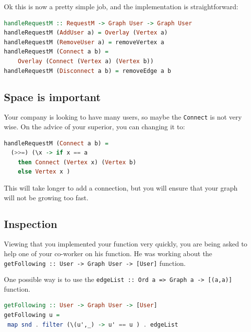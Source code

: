 \documentclass[10pt,a4paper]{article}
\begin{document}
Ok this is now a pretty simple job, and the implementation is straightforward: 
\begin{lstlisting}[language=Haskell, frame=single]
handleRequestM :: RequestM -> Graph User -> Graph User
handleRequestM (AddUser a) = Overlay (Vertex a)
handleRequestM (RemoveUser a) = removeVertex a
handleRequestM (Connect a b) = 
	Overlay (Connect (Vertex a) (Vertex b))
handleRequestM (Disconnect a b) = removeEdge a b
\end{lstlisting}

\subsection{Space is important}
Your company is looking to have many users, so maybe the \verb|Connect| is not very wise. On the advice of your superior, you can changing it to:
\begin{lstlisting}[language=Haskell, frame=single]
handleRequestM (Connect a b) = 
  (>>=) (\x -> if x == a 
    then Connect (Vertex x) (Vertex b)
    else Vertex x )
\end{lstlisting}

This will take longer to add a connection, but you will ensure that your graph will not be growing too fast.

\subsection{Inspection}
Viewing that you implemented your function very quickly, you are being asked to help one of your co-worker on his function. He was working about the \verb|getFollowing :: User -> Graph User -> [User]| function.

One possible way is to use the \verb|edgeList :: Ord a => Graph a -> [(a,a)]| function.

\begin{lstlisting}[language=Haskell, frame=single]
getFollowing :: User -> Graph User -> [User]
getFollowing u =
 map snd . filter (\(u',_) -> u' == u ) . edgeList
\end{lstlisting}
\end{document}
